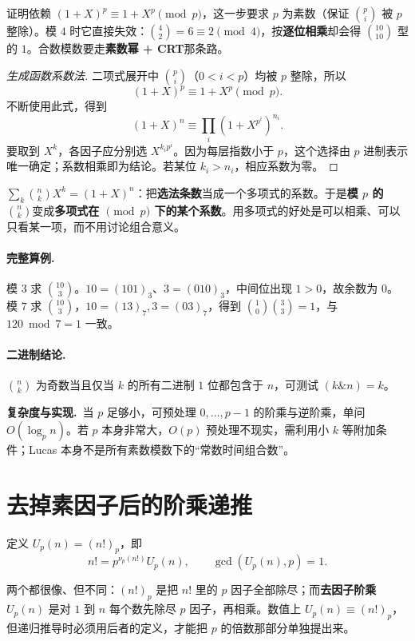 \documentclass[UTF8,a4paper,11pt,twoside,openright,fontset=fandol]{ctexbook}
\theoremstyle{definition}
\newcommand{\cost}{\par\noindent\textbf{复杂度与实现.}\ }
\begin{document}
\begin{tip}
证明依赖 $(1+X)^p\equiv1+X^p\pmod p$，这一步要求 $p$ 为素数（保证 $\binom pi$ 被 $p$ 整除）。模 $4$ 时它直接失效：$\binom42=6\equiv2\pmod4$，按\textbf{逐位相乘}却会得 $\binom{10}{10}$ 型的 $1$。合数模数要走\textbf{素数幂 + CRT}那条路。
\end{tip}


\begin{proof}[生成函数系数法]
二项式展开中 $\binom pi$（$0<i<p$）均被 $p$ 整除，所以
\[
(1+X)^p\equiv1+X^p\pmod p.
\]
不断使用此式，得到
\[
 (1+X)^n\equiv\prod_i(1+X^{p^i})^{n_i}.
\]
要取到 $X^k$，各因子应分别选 $X^{k_ip^i}$。因为每层指数小于 $p$，这个选择由 $p$ 进制表示唯一确定；系数相乘即为结论。若某位 $k_i>n_i$，相应系数为零。
\end{proof}

\begin{tip}
$\sum_k\binom nk X^k=(1+X)^n$：把\textbf{选法条数}当成一个多项式的系数。于是\textbf{模 $p$ 的 $\binom nk$}变成\textbf{多项式在 $\pmod p$ 下的某个系数}。用多项式的好处是可以相乘、可以只看某一项，而不用讨论组合意义。
\end{tip}

\paragraph{完整算例.} 模 $3$ 求 $\binom{10}{3}$。$10=(101)_3$、$3=(010)_3$，中间位出现 $1>0$，故余数为 $0$。模 $7$ 求 $\binom{10}{3}$，$10=(13)_7,3=(03)_7$，得到 $\binom10\binom33=1$，与 $120\bmod7=1$ 一致。
\paragraph{二进制结论.} $\binom nk$ 为奇数当且仅当 $k$ 的所有二进制 $1$ 位都包含于 $n$，可测试 $(k\mathbin{\&}n)=k$。
\cost 当 $p$ 足够小，可预处理 $0,\ldots,p-1$ 的阶乘与逆阶乘，单问 $O(\log_p n)$。若 $p$ 本身非常大，$O(p)$ 预处理不现实，需利用小 $k$ 等附加条件；Lucas 本身不是所有素数模数下的“常数时间组合数”。


\section{去掉素因子后的阶乘递推}
定义 $U_p(n)=(n!)_p$，即
\[
 n!=p^{\nu_p(n!)}U_p(n),\qquad\gcd(U_p(n),p)=1.
\]

\begin{tip}[$(n!)_p$ 与 $U_p(n)$ 的区别]
两个都很像、但不同：$(n!)_p$ 是把 $n!$ 里的 $p$ 因子全部除尽；而\textbf{去因子阶乘}$U_p(n)$ 是对 $1$ 到 $n$ 每个数先除尽 $p$ 因子，再相乘。数值上 $U_p(n)\equiv(n!)_p$，但递归推导时必须用后者的定义，才能把 $p$ 的倍数那部分单独提出来。
\end{tip}
\end{document}
